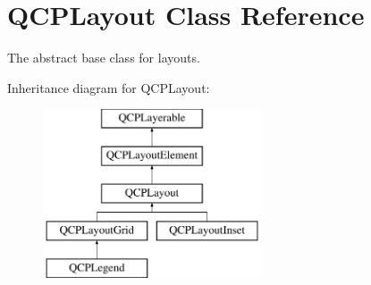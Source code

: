 \hypertarget{classQCPLayout}{\section{\-Q\-C\-P\-Layout \-Class \-Reference}
\label{classQCPLayout}
}


\-The abstract base class for layouts.  


\-Inheritance diagram for \-Q\-C\-P\-Layout\-:\begin{figure}[H]
\begin{center}
\leavevmode
\includegraphics[height=5.000000cm]{classQCPLayout}
\end{center}
\end{figure}
